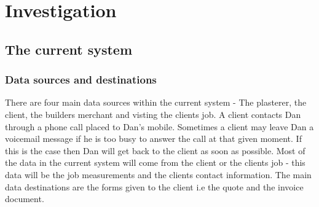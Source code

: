 \section{Investigation}

\subsection{The current system}





\subsubsection{Data sources and destinations}


\begin{flushleft}
	There are four main data sources within the current system - The plasterer, the client, the builders merchant and visting the clients job. A client contacts Dan through a phone call placed to Dan's mobile. Sometimes a client may leave Dan a voicemail message if he is too busy to answer the call at that given moment. If this is the case then Dan will get back to the client as soon as possible. Most of the data in the current system will come from the client or the clients job - this data will be the job measurements and the clients contact information. The main data destinations are the forms given to the client i.e the quote and the invoice document.

\end{flushleft}

